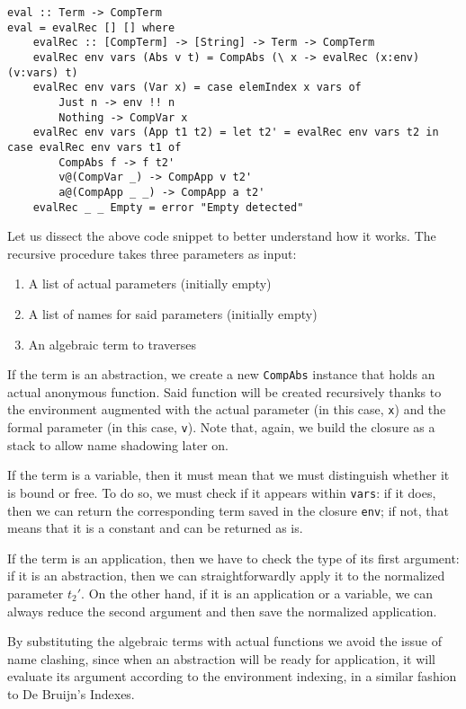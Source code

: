 \documentclass{article}
\begin{document}
\begin{lstlisting}
eval :: Term -> CompTerm
eval = evalRec [] [] where
    evalRec :: [CompTerm] -> [String] -> Term -> CompTerm
    evalRec env vars (Abs v t) = CompAbs (\ x -> evalRec (x:env) (v:vars) t)
    evalRec env vars (Var x) = case elemIndex x vars of
        Just n -> env !! n
        Nothing -> CompVar x
    evalRec env vars (App t1 t2) = let t2' = evalRec env vars t2 in case evalRec env vars t1 of
        CompAbs f -> f t2'
        v@(CompVar _) -> CompApp v t2'
        a@(CompApp _ _) -> CompApp a t2'
    evalRec _ _ Empty = error "Empty detected"
\end{lstlisting}

Let us dissect the above code snippet to better understand how it works. The recursive procedure takes three parameters as input:

\begin{enumerate}
    \item A list of actual parameters (initially empty)
    \item A list of names for said parameters (initially empty)
    \item An algebraic term to traverses
\end{enumerate}

If the term is an abstraction, we create a new \lstinline|CompAbs| instance that holds an actual anonymous function. Said function will be created recursively thanks to the environment augmented with the actual parameter (in this case, \lstinline|x|) and the formal parameter (in this case, \lstinline|v|). Note that, again, we build the closure as a stack to allow name shadowing later on.

If the term is a variable, then it must mean that we must distinguish whether it is bound or free. To do so, we must check if it appears within \lstinline|vars|: if it does, then we can return the corresponding term saved in the closure \lstinline|env|; if not, that means that it is a constant and can be returned as is.

If the term is an application, then we have to check the type of its first argument: if it is an abstraction, then we can straightforwardly apply it to the normalized parameter $t_2'$. On the other hand, if it is an application or a variable, we can always reduce the second argument and then save the normalized application.

By substituting the algebraic terms with actual functions we avoid the issue of name clashing, since when an abstraction will be ready for application, it will evaluate its argument according to the environment indexing, in a similar fashion to De Bruijn's Indexes.
\end{document}
